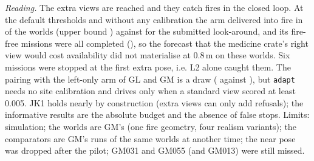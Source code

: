 \emph{Reading.} The extra views are reached and they catch fires in the closed loop. At the default thresholds and without any calibration the arm delivered into fire in \JKAdapt{} of the \JKWorlds{} worlds (upper bound \JKAdaptUpper) against \JKV{} for the submitted look-around, and its \JKPlain{} fire-free missions were all completed (\JKFalseStops{}), so the forecast that the medicine crate's right view would cost availability did not materialise at 0.8\,m on these worlds. Six missions were stopped at the first extra pose, i.e. L2 alone caught them. The pairing with the left-only arm of GL and GM is a draw (\JKOnlyLeft{} against \JKOnlyAdaptL{}), but \texttt{adapt} needs no site calibration and drives only when a standard view scored at least 0.005. JK1 holds nearly by construction (extra views can only add refusals); the informative results are the absolute budget and the absence of false stops. Limits: simulation; the worlds are GM's (one fire geometry, four realism variants); the comparators are GM's runs of the same worlds at another time; the near pose was dropped after the pilot; GM031 and GM055 (and GM013) were still missed.
